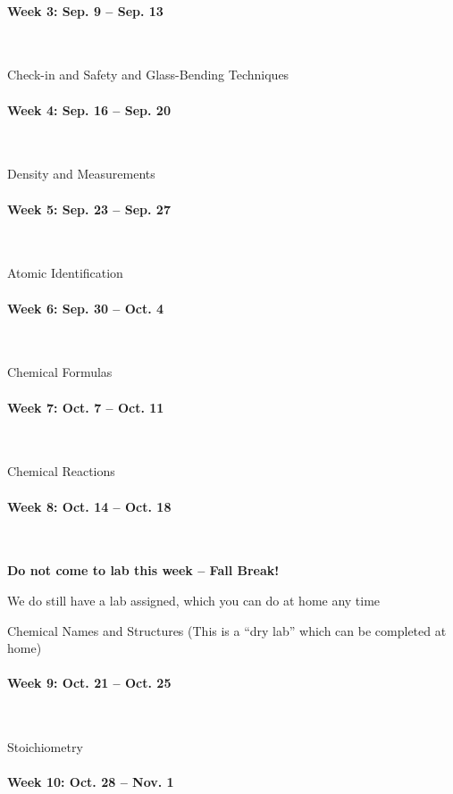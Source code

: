 \documentclass[12pt, letterpaper]{article}
\begin{document}
\paragraph{Week 3: Sep. 9 -- Sep. 13}~

Check-in and Safety and Glass-Bending Techniques

\paragraph{Week 4: Sep. 16 -- Sep. 20}~

Density and Measurements

\paragraph{Week 5: Sep. 23 -- Sep. 27}~

Atomic Identification

\paragraph{Week 6: Sep. 30 -- Oct. 4}~

Chemical Formulas

\paragraph{Week 7: Oct. 7 -- Oct. 11}~

Chemical Reactions

\paragraph{Week 8: Oct. 14 -- Oct. 18}~

\textbf{Do not come to lab this week -- Fall Break!}

We do still have a lab assigned, which you can do at home any time

Chemical Names and Structures (This is a ``dry lab'' which can be completed at home)

\paragraph{Week 9: Oct. 21 -- Oct. 25}~

Stoichiometry

\paragraph{Week 10: Oct. 28 -- Nov. 1}~
\end{document}
